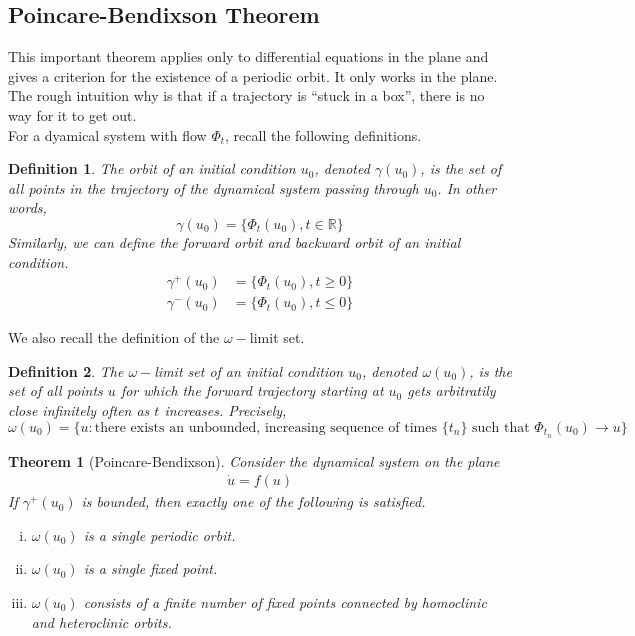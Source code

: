 \documentclass{article}
\newtheorem{theorem}{Theorem}[section]
\newtheorem{definition}{Definition}[section]
\def\R{{\mathbb R}}
\begin{document}
\subsection{Poincare-Bendixson Theorem}

This important theorem applies only to differential equations in the plane and gives a criterion for the existence of a periodic orbit. It only works in the plane. The rough intuition why is that if a trajectory is ``stuck in a box'', there is no way for it to get out.\\

For a dyamical system with flow $\Phi_t$, recall the following definitions.

\begin{definition}The \emph{orbit} of an initial condition $u_0$, denoted $\gamma(u_0)$, is the set of all points in the trajectory of the dynamical system passing through $u_0$. In other words,
\[
\gamma(u_0) = \{ \Phi_t(u_0), t \in \R \}
\]
Similarly, we can define the \emph{forward orbit} and \emph{backward orbit} of an initial condition.
\begin{align*}
\gamma^+(u_0) &= \{ \Phi_t(u_0), t \geq 0 \} \\
\gamma^-(u_0) &= \{ \Phi_t(u_0), t \leq 0 \}
\end{align*}
\end{definition}

We also recall the definition of the $\omega-$limit set.
\begin{definition}The \emph{$\omega-$limit set} of an initial condition $u_0$, denoted $\omega(u_0)$, is the set of all points $u$ for which the forward trajectory starting at $u_0$ gets arbitratily close infinitely often as $t$ increases. Precisely, 
\[
\omega(u_0) = \{ u : \text{there exists an unbounded, increasing sequence of times }\{t_n\} \text{ such that } \Phi_{t_n}(u_0) \rightarrow u \}
\]
\end{definition}

\begin{theorem}[Poincare-Bendixson]
Consider the dynamical system on the plane
\begin{align}\label{planarODE}
\dot{u} = f(u)
\end{align}
If $\gamma^+(u_0)$ is bounded, then exactly one of the following is satisfied.
\begin{enumerate}[(i)]
\item $\omega(u_0)$ is a single periodic orbit.
\item $\omega(u_0)$ is a single fixed point.
\item $\omega(u_0)$ consists of a finite number of fixed points connected by homoclinic and heteroclinic orbits.
\end{enumerate}
\end{theorem}
\end{document}
